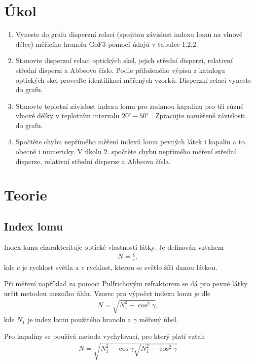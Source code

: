 \documentclass[a4paper,12pt]{article}
\begin{document}
\newcommand{\st}{^{\circ}}
\newcommand{\RJ}{\mbox{RJ}}
\newcommand{\mV}{\mbox{m}/\mbox{V}^2}

\section{Úkol}
\begin{enumerate}
    \item Vyneste do grafu disperzní relaci (spojitou závislost indexu lomu na vlnové délce) měřicího hranolu GoF3 pomocí údajů v tabulce 1.2.2.
    \item Stanovte disperzní relaci optických skel, jejich střední disperzi, relativní střední disperzi a Abbeovo číslo. Podle přiloženého výpisu z katalogu optických skel proveďte identifikaci měřených vzorků. Disperzní relaci vyneste do grafu.
    \item Stanovte teplotní závislost indexu lomu pro zadanou kapalinu pro tři různé vlnové délky v teplotním intervalu $20\st - 50\st$ . Zpracujte naměřené závislosti do grafu.
    \item Spočtěte chybu nepřímého měření indexů lomu pevných látek i kapalin a to obecně i numericky. V úkolu 2. spočtěte chybu nepřímého měření střední disperze, relativní střední disperze a Abbeova čísla. 
\end{enumerate}

\section{Teorie}
\subsection{Index lomu}
Index lomu charakterituje optické vlastnosti látky. Je definován vztahem
\begin{eqnarray}
N=\frac{c}{v},
\end{eqnarray}
kde $c$ je rychlost světla a $v$ rychlost, kterou se světlo šíří danou látkou.

Při měření například za pomoci Pulfrichovým refraktorem se dá pro pevné látky určit metodou mezního úhlu. 
Vzorec pro výpočet indexu lomu je dle \cite{text}
\begin{eqnarray}
N=\sqrt{N_1^2-\cos^2\gamma},
\label{N1}
\end{eqnarray}
kde $N_1$ je index lomu použitého hranolu a $\gamma$ měřený úhel.

Pro kapaliny se používá metoda vychylovací, pro který platí vztah
\begin{eqnarray}
N=\sqrt{N_1^2-\cos\gamma\sqrt{N_1^2-\cos^2\gamma}}
\label{N2}
\end{eqnarray}
\end{document}
